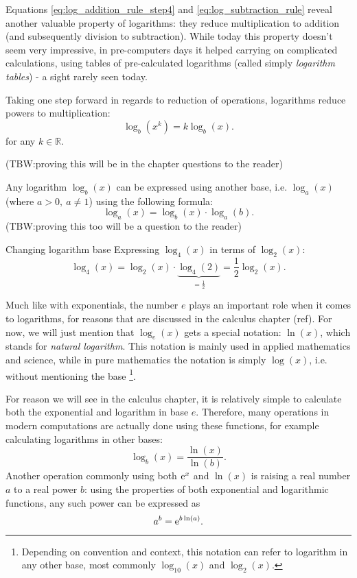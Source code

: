 Equations \ref{eq:log_addition_rule_step4} and \ref{eq:log_subtraction_rule} reveal another valuable property of logarithms: they reduce multiplication to addition (and subsequently division to subtraction). While today this property doesn't seem very impressive, in pre-computers days it helped carrying on complicated calculations, using tables of pre-calculated logarithms (called simply \emph{logarithm tables}) - a sight rarely seen today.

Taking one step forward in regards to reduction of operations, logarithms reduce powers to multiplication:
\begin{equation}
	\log_{b}\left( x^{k} \right) = k\log_{b}(x).
	\label{eq:log_product_rule}
\end{equation}
for any $k\in\mathbb{R}$.

(TBW:\@ proving this will be in the chapter questions to the reader)

Any logarithm $\log_{b}(x)$ can be expressed using another base, i.e. $\log_{a}(x)$ (where $a>0,\ a\neq1$) using the following formula:
\begin{equation}
	\log_{a}(x) = \log_{b}(x)\cdot\log_{a}(b).
	\label{eq:log_base_change}
\end{equation}
(TBW:\@ proving this too will be a question to the reader)

\begin{example}{Changing logarithm base}{}
	Expressing $\log_{4}(x)$ in terms of $\log_{2}(x)$:
	\[
		\log_{4}(x) = \log_{2}(x)\cdot\underbrace{\log_{4}(2)}_{=\frac{1}{2}} = \frac{1}{2}\log_{2}(x).
	\]
\end{example}

Much like with exponentials, the number $e$ plays an important role when it comes to logarithms, for reasons that are discussed in the calculus chapter (ref). For now, we will just mention that $\log_{e}(x)$ gets a special notation: $\ln(x)$, which stands for \emph{natural logarithm}. This notation is mainly used in applied mathematics and science, while in pure mathematics the notation is simply $\log(x)$, i.e. without mentioning the base \footnote{Depending on convention and context, this notation can refer to logarithm in any other base, most commonly $\log_{10}(x)$ and $\log_{2}(x)$.}.

For reason we will see in the calculus chapter, it is relatively simple to calculate both the exponential and logarithm in base $e$. Therefore, many operations in modern computations are actually done using these functions, for example calculating logarithms in other bases:
\begin{equation}
	\log_{b}(x) = \frac{\ln(x)}{\ln(b)}.
	\label{eq:ln_base_change}
\end{equation}
Another operation commonly using both $\mathrm{e}^{x}$ and $\ln(x)$ is raising a real number $a$ to a real power $b$: using the properties of both exponential and logarithmic functions, any such power can be expressed as
\begin{equation}
	a^{b} = \mathrm{e}^{b\ln(a)}.
	\label{eq:powers_using_e}
\end{equation}
